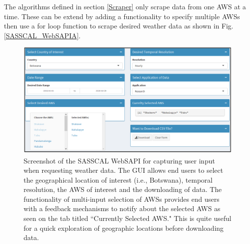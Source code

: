 \documentclass[a4paper, 10pt, conference]{ieeeconf}      %
\begin{document}
\noindent
The algorithms defined in section \ref{Scraper}   only scrape data from  one AWS at a time. These can be extend   by adding a functionality to specify  multiple AWSs   then   use a for loop function   to scrape  desired weather data as shown in Fig. \ref{SASSCAL_WebSAPIA}. 
\newpage
\noindent
\onecolumn
\begin{figure}
	\centering
	\includegraphics[width=1\linewidth]{fig/Selector}
	\caption{Screenshot of the SASSCAL WebSAPI for capturing user input when requesting weather data.  The GUI allows end users to select the geographical location of interest (i.e., Botswana), temporal resolution, the AWS of interest and the downloading of data. The functionality of multi-input selection of AWSs provides end users with a feedback mechanisms to notify about the selected AWS as seen on the tab titled ``Currently Selected AWS."
This is quite useful for a quick exploration of  geographic locations before downloading  data. 
}
	\label{SASSCAL_WebSAPI}
\end{figure}
\end{document}
